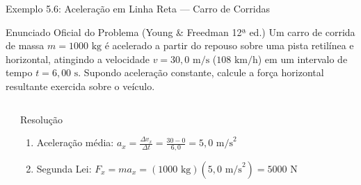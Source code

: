 \documentclass[10pt,aspectratio=169]{beamer}
\begin{document}
\begin{frame}{Exemplo 5.6: Aceleração em Linha Reta --- Carro de Corridas}
    \begin{block}{Enunciado Oficial do Problema (Young \& Freedman 12ª ed.)}
        \small
        Um carro de corrida de massa $m = 1000\text{ kg}$ é acelerado a partir do repouso sobre uma pista retilínea e horizontal, atingindo a velocidade $v = 30{,}0\text{ m/s}$ ($108\text{ km/h}$) em um intervalo de tempo $t = 6{,}00\text{ s}$. Supondo aceleração constante, calcule a força horizontal resultante exercida sobre o veículo.
    \end{block}
    \begin{columns}[T]
        \begin{center}
        \end{center}
        \begin{exampleblock}{Resolução}
            \small
            \begin{enumerate}\setlength{\itemsep}{3pt}
                \item Aceleração média: $a_x = \frac{\Delta v_x}{\Delta t} = \frac{30 - 0}{6{,}0} = 5{,}0\text{ m/s}^2$
                \item Segunda Lei: $F_x = m a_x = (1000\text{ kg})(5{,}0\text{ m/s}^2) = 5000\text{ N}$
            \end{enumerate}
        \end{exampleblock}
    \end{columns}
\end{frame}
\end{document}
